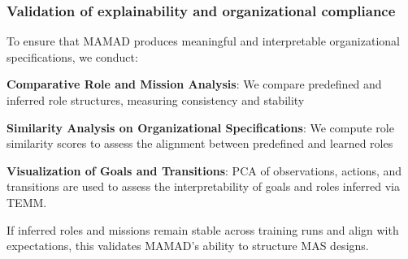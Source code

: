 \documentclass[pdflatex,sn-mathphys-num]{sn-jnl}%
\theoremstyle{thmstyleone}%
\theoremstyle{thmstyletwo}%
\theoremstyle{thmstylethree}%
\begin{document}
\subsubsection{Validation of explainability and organizational compliance}
To ensure that MAMAD produces meaningful and interpretable organizational specifications, we conduct:
\begin{enumerate*}[label={\roman*)}, itemjoin={; \quad}]
    \item \textbf{Comparative Role and Mission Analysis}: We compare predefined and inferred role structures, measuring consistency and stability
    \item \textbf{Similarity Analysis on Organizational Specifications}: We compute role similarity scores to assess the alignment between predefined and learned roles
    \item \textbf{Visualization of Goals and Transitions}: PCA of observations, actions, and transitions are used to assess the interpretability of goals and roles inferred via TEMM.
\end{enumerate*}
%
If inferred roles and missions remain stable across training runs and align with expectations, this validates MAMAD's ability to structure MAS designs.


\end{document}
